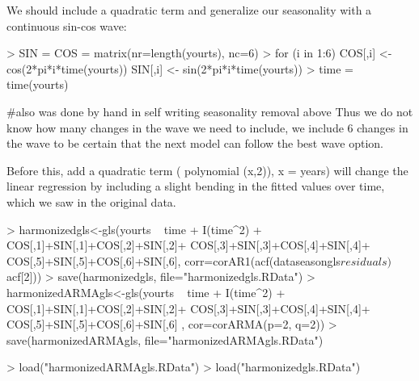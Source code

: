\documentclass[11pt, a4paper]{article} %
\begin{document}
We should include a quadratic term and generalize our seasonality with a continuous sin-cos wave:\\

\begin{Schunk}
\begin{Sinput}
> SIN = COS = matrix(nr=length(yourts), nc=6)
> for (i in 1:6) {
   COS[,i] <- cos(2*pi*i*time(yourts))
   SIN[,i] <- sin(2*pi*i*time(yourts)) 
 }
> time = time(yourts)
\end{Sinput}
\end{Schunk}
#also was done by hand in self writing seasonality removal above
Thus we do not know how many changes in the wave we need to include, we include 6 changes in the wave to be certain that the next model can follow the best wave option. 

Before this, add a quadratic term ( polynomial (x,2)), x = years) will change the linear regression by including a slight bending in the fitted values over time, which we saw in the original data. 


\begin{Schunk}
\begin{Sinput}
> harmonizedgls<-gls(yourts ~ time + I(time^2) +
                     COS[,1]+SIN[,1]+COS[,2]+SIN[,2]+
                     COS[,3]+SIN[,3]+COS[,4]+SIN[,4]+
                     COS[,5]+SIN[,5]+COS[,6]+SIN[,6],
                   corr=corAR1(acf(dataseasongls$residuals)$acf[2]))
> save(harmonizedgls, file="harmonizedgls.RData")
> harmonizedARMAgls<-gls(yourts ~ time + I(time^2) +
                       COS[,1]+SIN[,1]+COS[,2]+SIN[,2]+
                       COS[,3]+SIN[,3]+COS[,4]+SIN[,4]+
                       COS[,5]+SIN[,5]+COS[,6]+SIN[,6]
                     , cor=corARMA(p=2, q=2))
> save(harmonizedARMAgls, file="harmonizedARMAgls.RData")
\end{Sinput}
\end{Schunk}

\begin{Schunk}
\begin{Sinput}
> load("harmonizedARMAgls.RData")
> load("harmonizedgls.RData")
\end{Sinput}
\end{Schunk}
\end{document}
